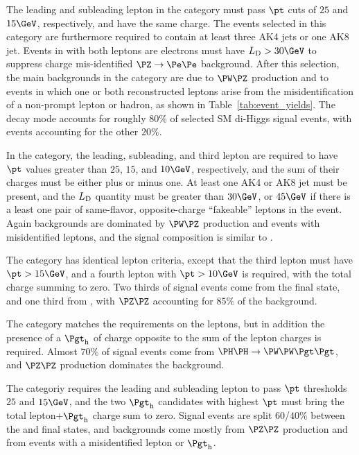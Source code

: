 The leading and subleading lepton in the \llss category must pass $\pt$ cuts of $25$ and $15\GeV$, respectively,
and have the same charge.
The events selected in this category are furthermore required to contain at least three AK4 jets or one AK8 jet. %
Events in with both leptons are electrons must have $\metLD > 30\GeV$ to suppress
charge mis-identified $\Zee$ background.
After this selection, the main backgrounds in the \llss category are due to $\PW\PZ$ production
and to events in which one or both reconstructed leptons arise from the misidentification of a non-prompt lepton or hadron,
as shown in Table~\ref{tab:event_yields}.
The \WWWW decay mode accounts for roughly $80\%$ of
selected SM di-Higgs signal events, with \WWtt events accounting for the other $20\%$.

In the \lllnot category, 
the leading, subleading, and third lepton are required to
have $\pt$ values greater than $25$, $15$, and $10\GeV$, respectively, and the sum of their charges must be either plus or minus one.
At least one AK4 or AK8 jet must be present, and the $L_\mathrm{D}$ quantity must be greater than $30\GeV$,
or $45\GeV$ if there is a least one pair of same-flavor, opposite-charge ``fakeable''
leptons in the event.  Again backgrounds are dominated by $\PW\PZ$ production and events with misidentified
leptons, and the signal composition is similar to \llss.

The \llll category has identical lepton criteria, except that the third lepton
must have $\pt > 15\GeV$, and a fourth lepton with $\pt > 10\GeV$ is required, with
the total charge summing to zero.  Two thirds of signal events come from the \WWWW final
state, and one third from \WWtt, with $\PZ\PZ$ accounting for $85\%$ of the background.

The \lllt category matches the \lllnot requirements on the leptons, 
but in addition the presence of a $\tauh$ of charge opposite to the sum of the lepton charges is required.  
Almost $70\%$ of signal events come from $\HH \to \WWtt$,
and $\PZ\PZ$ production dominates the background.  

The \lltt categoriy requires
the leading and subleading lepton to pass $\pt$ thresholds $25$ and $15\GeV$, 
and the two $\tauh$ candidates with highest $\pt$ must bring the total lepton+$\tauh$ charge sum to zero.
Signal events are split $60$/$40\%$ between the \WWtt and \tttt final
states, and backgrounds come mostly from $\PZ\PZ$ production and from events with a misidentified lepton or $\tauh$.

